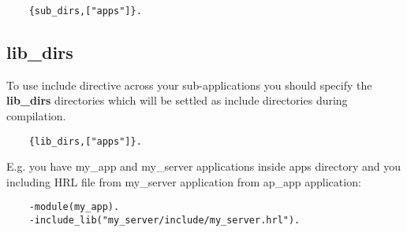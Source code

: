 \vspace{1\baselineskip}
\begin{lstlisting}
    {sub_dirs,["apps"]}.
\end{lstlisting}
\vspace{1\baselineskip}

\subsection{lib\_dirs}

To use include directive across your sub-applications
you should specify the {\bf lib\_dirs} directories
which will be settled as include directories during compilation.

\vspace{1\baselineskip}
\begin{lstlisting}
    {lib_dirs,["apps"]}.
\end{lstlisting}
\vspace{1\baselineskip}

E.g. you have my\_app and my\_server applications
inside apps directory and you including HRL file
from my\_server application from ap\_app application:

\vspace{1\baselineskip}
\begin{lstlisting}
    -module(my_app).
    -include_lib("my_server/include/my_server.hrl").
\end{lstlisting}
\vspace{1\baselineskip}
